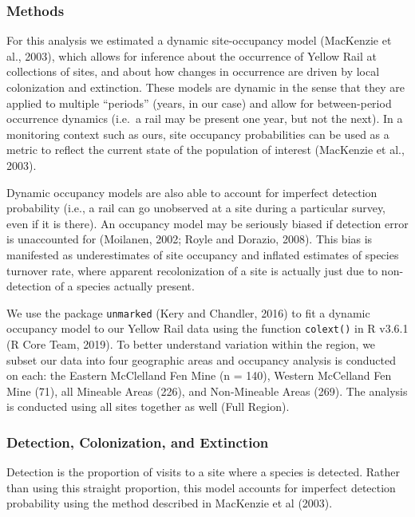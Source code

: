 \documentclass[11pt,]{article}
\begin{document}
\subsubsection{Methods}\label{methods}

For this analysis we estimated a dynamic site-occupancy model (MacKenzie
et al., 2003), which allows for inference about the occurrence of Yellow
Rail at collections of sites, and about how changes in occurrence are
driven by local colonization and extinction. These models are dynamic in
the sense that they are applied to multiple ``periods'' (years, in our
case) and allow for between-period occurrence dynamics (i.e.~a rail may
be present one year, but not the next). In a monitoring context such as
ours, site occupancy probabilities can be used as a metric to reflect
the current state of the population of interest (MacKenzie et al.,
2003).

Dynamic occupancy models are also able to account for imperfect
detection probability (i.e., a rail can go unobserved at a site during a
particular survey, even if it is there). An occupancy model may be
seriously biased if detection error is unaccounted for (Moilanen, 2002;
Royle and Dorazio, 2008). This bias is manifested as underestimates of
site occupancy and inflated estimates of species turnover rate, where
apparent recolonization of a site is actually just due to non-detection
of a species actually present.

We use the package \texttt{unmarked} (Kery and Chandler, 2016) to fit a
dynamic occupancy model to our Yellow Rail data using the function
\texttt{colext()} in R v3.6.1 (R Core Team, 2019). To better understand
variation within the region, we subset our data into four geographic
areas and occupancy analysis is conducted on each: the Eastern
McClelland Fen Mine (n = 140), Western McCelland Fen Mine (71), all
Mineable Areas (226), and Non-Mineable Areas (269). The analysis is
conducted using all sites together as well (Full Region).

\subsubsection{Detection, Colonization, and
Extinction}\label{detection-colonization-and-extinction}

Detection is the proportion of visits to a site where a species is
detected. Rather than using this straight proportion, this model
accounts for imperfect detection probability using the method described
in MacKenzie et al (2003).
\end{document}
